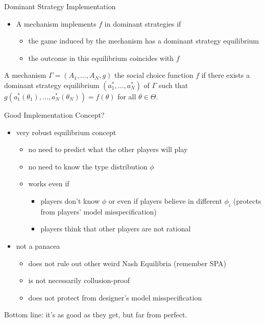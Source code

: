 \documentclass[english,10pt
,aspectratio=169
]{beamer}
\begin{document}
\begin{frame}{Dominant Strategy Implementation}
	\begin{itemize}
		\item A mechanism \alert{implements $f$ in dominant strategies} if
		\begin{itemize}
			\item the game induced by the mechanism has a dominant strategy equilibrium
			\item the outcome in this equilibrium coincides with $f$
		\end{itemize}
	\end{itemize}
	\begin{definition}
		A mechanism $\Gamma=(A_{1},\dots,A_{N},g)$  the social choice function $f$  if there exists a dominant strategy equilibrium $(a_1^*,\dots,a_N^*)$ of $\Gamma$ such that $g(a_1^*(\theta_{1}),\dots,a_N^*(\theta_{N}))=f(\theta)$ for all $\theta\in\Theta$.
	\end{definition}
\end{frame}


\begin{frame}{Good Implementation Concept?}
	\begin{itemize}
		\item very robust equilibrium concept
		\begin{itemize}
			\item no need to predict what the other players will play
			\item no need to know the type distribution $\phi$
			\item works even if
			\begin{itemize}
				\item players don't know $\phi$ or even if players believe in different $\phi_{i}$ (protects from players' model misspecification)
				\item players think that other players are not rational
			\end{itemize}
		\end{itemize}
		\item not a panacea
		\begin{itemize}
			\item does not rule out other weird Nash Equilibria (remember SPA)
			\item is not necessarily collusion-proof
			\item does not protect from designer's model misspecification
		\end{itemize}
	\end{itemize}
	Bottom line: it's as good as they get, but far from perfect.
\end{frame}
\end{document}
